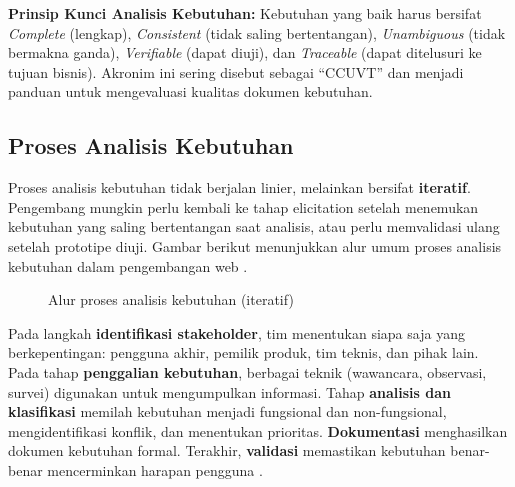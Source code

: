 \begin{konsep}
\textbf{Prinsip Kunci Analisis Kebutuhan:} Kebutuhan yang baik harus bersifat \textit{Complete} (lengkap), \textit{Consistent} (tidak saling bertentangan), \textit{Unambiguous} (tidak bermakna ganda), \textit{Verifiable} (dapat diuji), dan \textit{Traceable} (dapat ditelusuri ke tujuan bisnis). Akronim ini sering disebut sebagai ``CCUVT'' dan menjadi panduan untuk mengevaluasi kualitas dokumen kebutuhan.
\end{konsep}

\subsection{Proses Analisis Kebutuhan}

Proses analisis kebutuhan tidak berjalan linier, melainkan bersifat \textbf{iteratif}. Pengembang mungkin perlu kembali ke tahap elicitation setelah menemukan kebutuhan yang saling bertentangan saat analisis, atau perlu memvalidasi ulang setelah prototipe diuji. Gambar berikut menunjukkan alur umum proses analisis kebutuhan dalam pengembangan web \cite{webdevLearn}.

\begin{figure}[H]
\centering
{}
\caption{Alur proses analisis kebutuhan (iteratif)}
\end{figure}

Pada langkah \textbf{identifikasi stakeholder}, tim menentukan siapa saja yang berkepentingan: pengguna akhir, pemilik produk, tim teknis, dan pihak lain. Pada tahap \textbf{penggalian kebutuhan}, berbagai teknik (wawancara, observasi, survei) digunakan untuk mengumpulkan informasi. Tahap \textbf{analisis dan klasifikasi} memilah kebutuhan menjadi fungsional dan non-fungsional, mengidentifikasi konflik, dan menentukan prioritas. \textbf{Dokumentasi} menghasilkan dokumen kebutuhan formal. Terakhir, \textbf{validasi} memastikan kebutuhan benar-benar mencerminkan harapan pengguna \cite{mdnLearn}.
